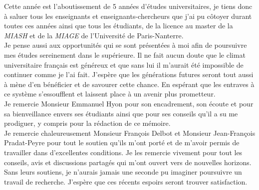 \documentclass[
12pt, %
french, %
singlespacing, %
headsepline, %
]{MastersDoctoralThesis} %
\begin{document}
\ohead*{} %
\ofoot*{\pagemark} %
\begin{acknowledgements}

Cette année est l'aboutissement de 5 années d'études universitaires, je tiens donc à saluer tous les enseignants et enseignants-chercheurs que j'ai pu côtoyer durant toutes ces années ainsi que tous les étudiants, de la licence au master de la \textit{MIASH} et de la \textit{MIAGE} de l'Université de Paris-Nanterre.\\

Je pense aussi aux opportunités qui se sont présentées à moi afin de poursuivre mes études sereinement dans le supérieure. Il ne fait aucun doute que le climat universitaire français est généreux et que sans lui il m'aurait été impossible de continuer comme je l'ai fait. J'espère que les générations futures seront tout aussi à mène d'en bénéficier et de savourer cette chance. En espérant que les entraves à ce système s'essoufflent et laissent place à un avenir plus prometteur.\\

Je remercie Monsieur Emmanuel Hyon pour son encadrement, son écoute et pour sa bienveillance envers ses étudiants ainsi que pour ses conseils qu'il a su me prodiguer, y compris pour la rédaction de ce mémoire.\\

Je remercie chaleureusement Monsieur François Delbot et Monsieur Jean-François Pradat-Peyre pour tout le soutien qu'ils m'ont porté et de m'avoir permis de travailler dans d'excellentes conditions. Je les remercie vivement pour tout les conseils, avis et discussions partagés qui m'ont ouvert vers de nouvelles horizons.
Sans leurs soutiens, je n'aurais jamais une seconde pu imaginer poursuivre un travail de recherche. J'espère que ces récents espoirs seront trouver satisfaction.

\end{acknowledgements}



\tableofcontents %
\end{document}
